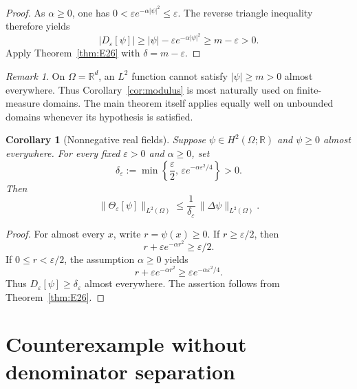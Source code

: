 \documentclass[11pt]{article}
\newtheorem{corollary}{Corollary}
\theoremstyle{remark}
\newtheorem{remark}{Remark}
\begin{document}
\begin{proof}
As $\alpha\geq0$, one has
$0<\varepsilon e^{-\alpha|\psi|^2}\leq\varepsilon$.
The reverse triangle inequality therefore yields
\[
|D_\varepsilon[\psi]|
\geq|\psi|-\varepsilon e^{-\alpha|\psi|^2}
\geq m-\varepsilon>0.
\]
Apply Theorem~\ref{thm:E26} with $\delta=m-\varepsilon$.
\end{proof}

\begin{remark}
On $\Omega=\mathbb R^d$, an $L^2$ function cannot satisfy
$|\psi|\geq m>0$ almost everywhere. Thus
Corollary~\ref{cor:modulus} is most naturally used on finite-measure
domains. The main theorem itself applies equally well on unbounded
domains whenever its hypothesis is satisfied.
\end{remark}

\begin{corollary}[Nonnegative real fields]\label{cor:nonnegative}
Suppose $\psi\in H^2(\Omega;\mathbb R)$ and $\psi\geq0$ almost
everywhere. For every fixed $\varepsilon>0$ and $\alpha\geq0$, set
\begin{equation}\label{eq:deltaeps}
\delta_\varepsilon
:=\min\left\{\frac{\varepsilon}{2},\,
\varepsilon e^{-\alpha\varepsilon^2/4}\right\}>0.
\end{equation}
Then
\begin{equation}\label{eq:nonnegative}
\bigl\|\Theta_\varepsilon[\psi]\bigr\|_{L^2(\Omega)}
\leq\frac{1}{\delta_\varepsilon}\,
\bigl\|\Delta\psi\bigr\|_{L^2(\Omega)}.
\end{equation}
\end{corollary}

\begin{proof}
For almost every $x$, write $r=\psi(x)\geq0$.
If $r\geq\varepsilon/2$, then
\[
r+\varepsilon e^{-\alpha r^2}\geq\varepsilon/2.
\]
If $0\leq r<\varepsilon/2$, the assumption $\alpha\geq0$ yields
\[
r+\varepsilon e^{-\alpha r^2}
\geq\varepsilon e^{-\alpha\varepsilon^2/4}.
\]
Thus $D_\varepsilon[\psi]\geq\delta_\varepsilon$ almost
everywhere. The assertion follows from Theorem~\ref{thm:E26}.
\end{proof}

\section{Counterexample without denominator separation}
\end{document}
